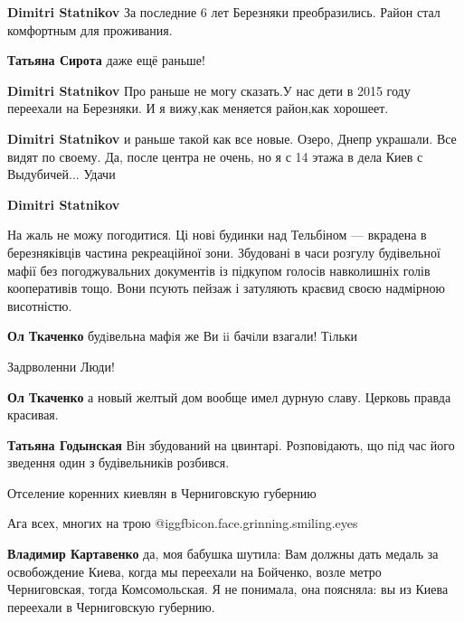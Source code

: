 \begin{itemize}
\begin{itemize} %
\textbf{Dimitri Statnikov} За последние 6 лет Березняки преобразились.
Район стал комфортным для проживания.

\textbf{Татьяна Сирота} даже ещё раньше!

\textbf{Dimitri Statnikov} Про раньше не могу сказать.У нас дети в 2015 году переехали на Березняки. И я вижу,как меняется район,как хорошеет.

\textbf{Dimitri Statnikov} и раньше такой как все новые. Озеро, Днепр украшали. Все видят по своему. Да, после центра не очень, но я с 14 этажа в дела Киев с Выдубичей...
Удачи

\textbf{Dimitri Statnikov} 

На жаль не можу погодитися. Ці нові будинки над Тельбіном — вкрадена в
березняківців частина рекреаційної зони. Збудовані в часи розгулу будівельної
мафії без погоджувальних документів із підкупом голосів навколишніх голів
кооперативів тощо. Вони псують пейзаж і затуляють краєвид своєю надмірною
висотністю.

\begin{itemize} %
\textbf{Ол Ткаченко} будiвельна мафiя же Ви ii бачiли взагали! Тiльки

Задрволенни Люди!

\textbf{Ол Ткаченко} а новый желтый дом вообще имел дурную славу. Церковь правда красивая.

\textbf{Татьяна Годынская} Він збудований на цвинтарі. Розповідають, що під час його зведення один з будівельників розбився.
\end{itemize} %

\end{itemize} %

Отселение коренних киевлян в Черниговскую губернию

\begin{itemize} %
Ага всех, многих на трою @igg{fbicon.face.grinning.smiling.eyes} 

\textbf{Владимир Картавенко} да, моя бабушка шутила: Вам должны дать медаль за освобождение Киева, когда мы переехали на Бойченко, возле метро Черниговская, тогда Комсомольская. Я не понимала, она поясняла: вы из Киева переехали в Черниговскую губернию.
\end{itemize} %


\end{itemize}
